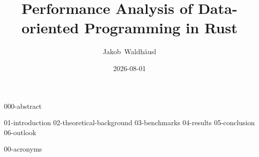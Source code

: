 \documentclass[a4paper,oneside,10pt,ngerman,english]{scrbook}
\begin{document}
\frontmatter

\title{Performance Analysis of Data-oriented Programming in Rust}
\author{ Jakob~Waldhäusl }
\date{2026-08-01}

\maketitle


{000-abstract}

\cleardoubleoddpage
\tableofcontents


\mainmatter

{01-introduction}
{02-theoretical-background}
{03-benchmarks}
{04-results}
{05-conclusion}
{06-outlook}




\cleardoubleoddpage
\printbibliography

\cleardoubleoddpage
{00-acronyms}


\cleardoubleoddpage
\end{document}
